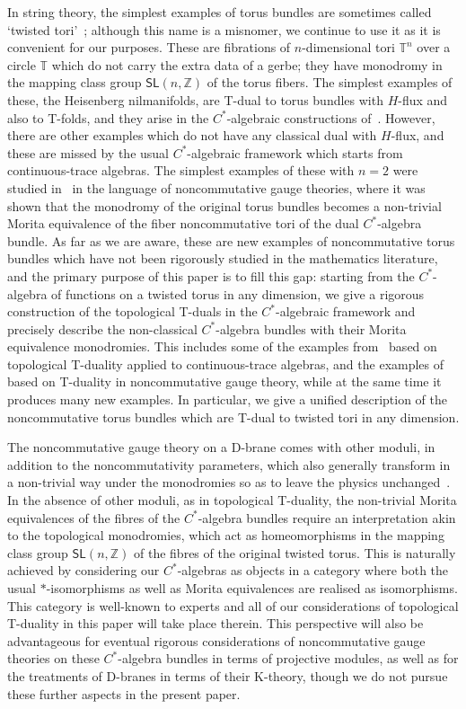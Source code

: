 \documentclass[10pt,a4paper]{amsart}
\numberwithin{equation}{section}
\newcommand{\Z}{\zed}
\newcommand{\sfSL}{\mathsf{SL}}
\newcommand{\zed}{{\mathbb Z}} %
\newcommand{\torus}{{\mathbb T}} %
\begin{document}
 In string theory, the simplest examples of torus bundles are sometimes
called `twisted to\-ri'~\cite{Dabholkar2002}; although this name is a
misnomer, we continue to use it as it is convenient for our
purposes. These are fibrations of $n$-dimensional tori $\torus^n$ over
a circle $\torus$ which do not carry the extra data of a gerbe; they have
monodromy in the mapping class group $\sfSL(n,\Z)$ of the torus
fibers. The simplest examples of these, the Heisenberg nilmanifolds,
are T-dual to torus bundles with $H$-flux and also to T-folds, and they
arise in the $C^*$-algebraic constructions
of~\cite{Mathai2004,Mathai2005}. However, there are other examples
which do not have any classical dual with $H$-flux, and these are
missed by the usual $C^*$-algebraic framework which starts from
continuous-trace algebras. The simplest examples of these with $n=2$ were studied
in~\cite{Hull2019} in the language of noncommutative gauge theories,
where it was shown that the monodromy of the original torus bundles
becomes a non-trivial Morita equivalence of the fiber noncommutative
tori of the dual $C^*$-algebra bundle. As far as we are aware, these
are new examples of noncommutative torus bundles which have not been
rigorously studied in the mathematics literature, and the primary
purpose of this paper is to fill this gap: starting from the
$C^*$-algebra of functions on a twisted torus in any dimension, we
give a rigorous construction of the topological T-duals in the
$C^*$-algebraic framework and precisely describe the non-classical
$C^*$-algebra bundles with their Morita equivalence monodromies. This
includes some of the examples from~\cite{Mathai2004,Mathai2005} based
on topological T-duality applied to continuous-trace algebras, and the
examples of~\cite{Hull2019} based on T-duality in noncommutative gauge
theory, while at the same time it produces many new examples. In
particular, we give a unified description of the noncommutative torus bundles
which are T-dual to twisted tori in any dimension.

The noncommutative gauge theory on a D-brane comes with other moduli,
in addition to the noncommutativity parameters, which also generally
transform in a non-trivial way under the monodromies so as to leave the physics
unchanged~\cite{Hull2019}. In the absence of other moduli, as in topological
T-duality, the non-trivial Morita equivalences of the fibres of the
$C^*$-algebra bundles require an interpretation akin to the
topological monodromies, which act as homeomorphisms in the mapping
class group $\sfSL(n,\Z)$ of the fibres of the original twisted
torus. This is naturally achieved by considering our $C^*$-algebras as objects in a
category where both the usual $*$-isomorphisms as well as Morita equivalences are
realised as isomorphisms. This category is well-known to experts and
all of our considerations of topological T-duality in this paper will
take place therein. This perspective will also be advantageous for
eventual rigorous considerations of noncommutative gauge theories on
these $C^*$-algebra bundles in terms of projective modules, as well as
for the treatments of D-branes in terms of their K-theory, though we
do not pursue these further aspects in the present paper.
\end{document}
